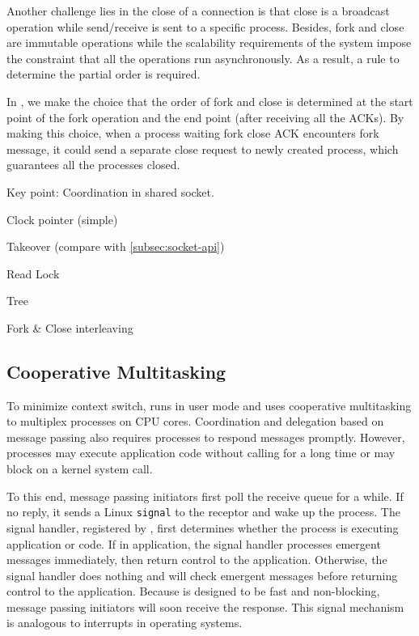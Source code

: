 Another challenge lies in the close of a connection is that close is a broadcast operation while send/receive is sent to a specific process. Besides, fork and close are immutable operations while the scalability requirements of the system impose the constraint that all the operations run asynchronously. As a result, a rule to determine the partial order is required.

In \libipc, we make the choice that the order of fork and close is determined at the start point of the fork operation and the end point (after receiving all the ACKs). By making this choice, when a process waiting fork close ACK encounters fork message, it could send a separate close request to newly created process, which guarantees all the processes closed.
  
Key point: Coordination in shared socket.

Clock pointer (simple)

Takeover (compare with \ref{subsec:socket-api})

Read Lock

Tree

Fork \& Close interleaving

\subsection{Cooperative Multitasking}
\label{subsec:process-mux}

To minimize context switch, \sys{} runs in user mode and uses cooperative multitasking to multiplex processes on CPU cores. Coordination and delegation based on message passing also requires processes to respond messages promptly. However, processes may execute application code without calling \libipc for a long time or may block on a kernel system call.

To this end, message passing initiators first poll the receive queue for a while. If no reply, it sends a Linux \texttt{signal} to the receptor and wake up the process. The signal handler, registered by \libipc, first determines whether the process is executing application or \libipc code. If in application, the signal handler processes emergent messages immediately, then return control to the application. Otherwise, the signal handler does nothing and \libipc will check emergent messages before returning control to the application. Because \libipc is designed to be fast and non-blocking, message passing initiators will soon receive the response. This signal mechanism is analogous to interrupts in operating systems.


